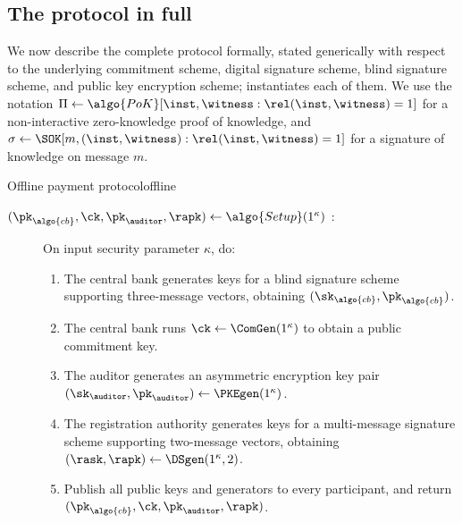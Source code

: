 \subsection{The protocol in full}

We now describe the complete protocol formally, stated generically with respect
to the underlying commitment scheme, digital signature scheme, blind signature
scheme, and public key encryption scheme; 
instantiates each of them. We use the notation $\Pi \leftarrow
\algo{PoK}[\inst, \witness : \rel(\inst, \witness) = 1]$ for a non-interactive
zero-knowledge proof of knowledge, and $\sigma \leftarrow \SOK[m, (\inst,
\witness) : \rel(\inst, \witness) = 1]$ for a signature of knowledge on message
$m$.

\begin{protocolbox}{Offline payment protocol}{offline}

  \begin{description}

    \item[$(\pk_{\algo{cb}}, \ck, \pk_{\auditor}, \rapk) \leftarrow
      \algo{Setup}(1^\kappa)$ :]\label{sec:offline:construction:setup} On input
      security parameter $\kappa$, do:

      \begin{enumerate}

        \item The central bank generates keys for a blind signature scheme
          supporting three-message vectors, obtaining $(\sk_{\algo{cb}},
          \pk_{\algo{cb}})$.

        \item The central bank runs $\ck \leftarrow \ComGen(1^\kappa)$ to
          obtain a public commitment key.

        \item The auditor generates an asymmetric encryption key pair
          $(\sk_{\auditor}, \pk_{\auditor}) \leftarrow \PKEgen(1^\kappa)$.

        \item The registration authority generates keys for a multi-message
          signature scheme supporting two-message vectors, obtaining $(\rask,
          \rapk) \leftarrow \DSgen(1^\kappa, 2)$.

        \item Publish all public keys and generators to every participant, and
          return $(\pk_{\algo{cb}}, \ck, \pk_{\auditor}, \rapk)$.


\end{enumerate}
\end{description}
\end{protocolbox}
